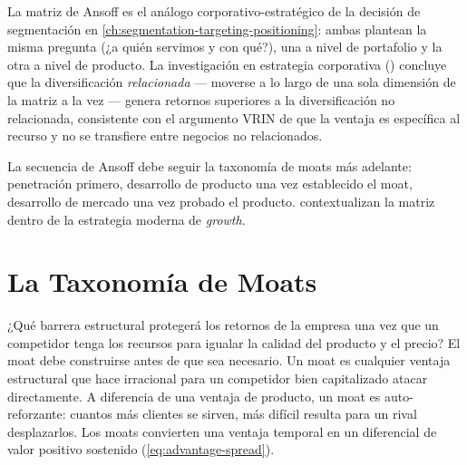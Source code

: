 La matriz de Ansoff es el análogo corporativo-estratégico de la decisión de segmentación en
\cref{ch:segmentation-targeting-positioning}: ambas plantean la misma pregunta (¿a quién
servimos y con qué?), una a nivel de portafolio y la otra a nivel de producto. La
investigación en estrategia corporativa (\parencite{dranove7theconomics}) concluye que la
diversificación \emph{relacionada} --- moverse a lo largo de una sola dimensión de la matriz
a la vez --- genera retornos superiores a la diversificación no relacionada, consistente con
el argumento VRIN de que la ventaja es específica al recurso y no se transfiere entre
negocios no relacionados.

La secuencia de Ansoff debe seguir la taxonomía de moats más adelante: penetración primero,
desarrollo de producto una vez establecido el moat, desarrollo de mercado una vez probado el
producto. \textcite{kotler2021} contextualizan la matriz dentro de la estrategia moderna de
\emph{growth}.

\section{La Taxonomía de Moats}\label{sec:moat-taxonomy}

¿Qué barrera estructural protegerá los retornos de la empresa una vez que un competidor
tenga los recursos para igualar la calidad del producto y el precio? El moat debe construirse
antes de que sea necesario. Un moat es cualquier ventaja estructural que hace irracional para
un competidor bien capitalizado atacar directamente. A diferencia de una ventaja de producto,
un moat es auto-reforzante: cuantos más clientes se sirven, más difícil resulta para un
rival desplazarlos. Los moats convierten una ventaja temporal en un diferencial de valor
positivo sostenido (\cref{eq:advantage-spread}).

